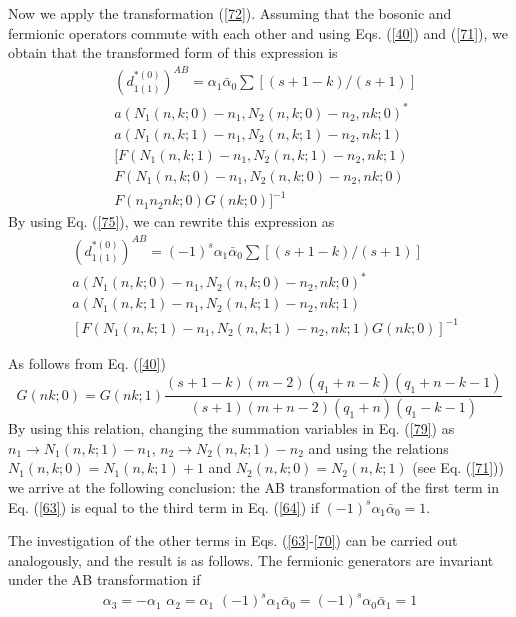 \documentclass[a4paper,12pt]{article}%
\begin{document}
Now we apply the transformation (\ref{72}). Assuming that the
bosonic and fermionic operators commute with each other
and using Eqs. (\ref{40}) and (\ref{71}), we obtain that 
the transformed form of this expression is
\begin{eqnarray}
&(d_{1(1)}^{*(0)})^{AB}=\alpha_1{\bar\alpha}_0
\sum [(s+1-k)/(s+1)]\nonumber\\
&a(N_1(n,k;0)-n_1,N_2(n,k;0)-n_2,nk;0)^*\nonumber\\
&a(N_1(n,k;1)-n_1,N_2(n,k;1)-n_2,nk;1)\nonumber\\
&[F(N_1(n,k;1)-n_1,N_2(n,k;1)-n_2,nk;1)\nonumber\\
&F(N_1(n,k;0)-n_1,N_2(n,k;0)-n_2,nk;0)\nonumber\\
&F(n_1n_2nk;0)G(nk;0)]^{-1}
\label{78}
\end{eqnarray}
By using Eq. (\ref{75}),
we can rewrite this expression as 
\begin{eqnarray}
&(d_{1(1)}^{*(0)})^{AB}=(-1)^s\alpha_1{\bar\alpha}_0
\sum [(s+1-k)/(s+1)]\nonumber\\
&a(N_1(n,k;0)-n_1,N_2(n,k;0)-n_2,nk;0)^*\nonumber\\
&a(N_1(n,k;1)-n_1,N_2(n,k;1)-n_2,nk;1)\nonumber\\
&[F(N_1(n,k;1)-n_1,N_2(n,k;1)-n_2,nk;1)G(nk;0)]^{-1}
\label{79}
\end{eqnarray}

As follows from Eq. (\ref{40})
\begin{equation}
G(nk;0)=G(nk;1)\frac{(s+1-k)(m-2)(q_1+n-k)(q_1+n-k-1)}
{(s+1)(m+n-2)(q_1+n)(q_1-k-1)}
\label{80}
\end{equation}
By using this relation, changing the summation
variables in Eq. (\ref{79}) as 
$n_1\rightarrow N_1(n,k;1)-n_1$,
$n_2\rightarrow N_2(n,k;1)-n_2$ and using the
relations $N_1(n,k;0)=N_1(n,k;1)+1$ and
$N_2(n,k;0)=N_2(n,k;1)$ (see Eq. (\ref{71})) we 
arrive at the following conclusion:
the AB transformation of the first term in Eq. (\ref{63})
is equal to the third term in Eq. (\ref{64}) if
$(-1)^s\alpha_1{\bar\alpha}_0=1$.

The investigation of the other terms in Eqs. 
(\ref{63}-\ref{70}) can be carried out analogously, and
the result is as follows. The fermionic generators are
invariant under the AB transformation if
\begin{eqnarray}
\alpha_3=-\alpha_1\,\, \alpha_2=\alpha_1\,\, 
(-1)^s\alpha_1{\bar\alpha}_0=(-1)^s\alpha_0{\bar\alpha}_1=1
\label{81}
\end{eqnarray}
\end{document}
